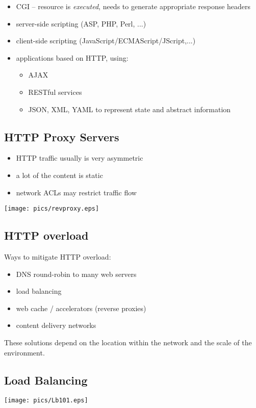 \documentclass[xga]{xdvislides}
\begin{document}
\begin{itemize}
	\item CGI -- resource is {\em executed}, needs to generate
		appropriate response headers
	\item server-side scripting (ASP, PHP, Perl, ...)
	\item client-side scripting (JavaScript/ECMAScript/JScript,...)
	\item applications based on HTTP, using:
		\begin{itemize}
			\item AJAX
			\item RESTful services
			\item JSON, XML, YAML to represent state and
				abstract information
		\end{itemize}
\end{itemize}

\subsection{HTTP Proxy Servers}
\begin{itemize}
	\item HTTP traffic usually is very asymmetric
	\item a lot of the content is static
	\item network ACLs may restrict traffic flow
\end{itemize}
\vspace{.25in}
\begin{center}
	\texttt{[image: pics/revproxy.eps]}
\end{center}

\subsection{HTTP overload}
Ways to mitigate HTTP overload:

\begin{itemize}
	\item DNS round-robin to many web servers
	\item load balancing
	\item web cache / accelerators (reverse proxies)
	\item content delivery networks
\end{itemize}

These solutions depend on the location within the network and the scale of
the environment.

\subsection{Load Balancing}
\begin{center}
	\texttt{[image: pics/Lb101.eps]}
\end{center}
\end{document}
